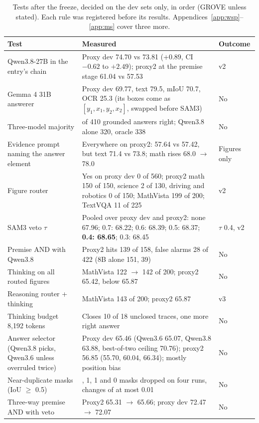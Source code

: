 \documentclass{article}
\begin{document}
\begin{table}[!htbp]
\centering\scriptsize
\caption{Tests after the freeze, decided on the dev sets only, in order (GROVE unless stated). Each rule was registered before its results.
Appendices~\ref{app:wsp}--\ref{app:ms} cover three more.}
\label{tab:post}
\begin{tabular}{@{}>{\raggedright\arraybackslash}p{1.15in}>{\raggedright\arraybackslash}p{3.4in}>{\raggedright\arraybackslash}p{.6in}@{}}
\toprule
Test & Measured & Outcome \\
\midrule
Qwen3.8-27B in the entry's chain & Proxy dev 74.70 vs 73.81 ($+0.89$, CI $-0.62$ to $+2.49$); proxy2 at the premise stage 61.04 vs 57.53 & v2 \\
Gemma 4 31B answerer & Proxy dev 69.77, text 79.5, mIoU 70.7, OCR 25.3 (its boxes come as $[y_1,x_1,y_2,x_2]$, swapped before SAM3) & No \\
Three-model majority & 316 of 410 grounded answers right; Qwen3.8 alone 320, oracle 338 & No \\
Evidence prompt naming the answer element & Everywhere on proxy2: 57.64 vs 57.42, but text 71.4 vs 73.8; math rises 68.0 $\to$ 78.0 & Figures only \\
Figure router & Yes on proxy dev 0 of 560; proxy2 math 150 of 150, science 2 of 130, driving and robotics 0 of 150; MathVista 199 of 200; TextVQA 11 of 225 & v2 \\
SAM3 veto $\tau$ & Pooled over proxy dev and proxy2: none 67.96; 0.7: 68.22; 0.6: 68.39; 0.5: 68.37; \textbf{0.4: 68.65}; 0.3: 68.45 & $\tau$ 0.4, v2 \\
Premise AND with Qwen3.8 & Proxy2 hits 139 of 158, false alarms 28 of 422 (8B alone 151, 39) & No \\
Thinking on all routed figures & MathVista 122 $\to$ 142 of 200; proxy2 65.42, below 65.87 & No \\
Reasoning router + thinking & MathVista 143 of 200; proxy2 65.87 & v3 \\
Thinking budget 8,192 tokens & Closes 10 of 18 unclosed traces, one more right answer & No \\
Answer selector (Qwen3.8 picks, Qwen3.6 unless overruled twice) & Proxy dev 65.46 (Qwen3.6 65.07, Qwen3.8 63.88, best-of-two ceiling 70.76); proxy2 56.85 (55.70, 60.04, 66.34); mostly position bias & No \\
Near-duplicate masks (IoU $\geq$ 0.5) & 11, 1, 1 and 0 masks dropped on four runs, changes of at most 0.01 & No \\
Three-way premise AND with veto & Proxy2 65.31 $\to$ 65.66; proxy dev 72.47 $\to$ 72.07 & No \\

\end{tabular}
\end{table}
\end{document}
